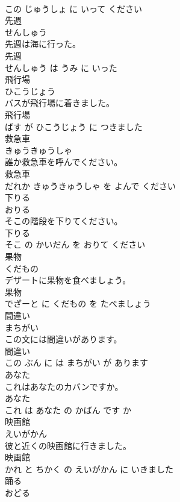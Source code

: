 \documentclass[8pt]{extreport}
\begin{document}
\begin{CJK}{UTF8}{min}
\\	この じゅうしょ に いって ください			
\\	先週	
\\	せんしゅう			
\\	先週は海に行った。	
\\	先週 
\\	せんしゅう は うみ に いった			
\\	飛行場	
\\	ひこうじょう			
\\	バスが飛行場に着きました。	
\\	飛行場 
\\	ばす が ひこうじょう に つきました			
\\	救急車	
\\	きゅうきゅうしゃ			
\\	誰か救急車を呼んでください。	
\\	救急車 
\\	だれか きゅうきゅうしゃ を よんで ください			
\\	下りる	
\\	おりる			
\\	そこの階段を下りてください。	
\\	下りる 
\\	そこ の かいだん を おりて ください			
\\	果物	
\\	くだもの			
\\	デザートに果物を食べましょう。	
\\	果物 
\\	でざーと に くだもの を たべましょう			
\\	間違い	
\\	まちがい			
\\	この文には間違いがあります。	
\\	間違い 
\\	この ぶん に は まちがい が あります			
\\	あなた	
\\	これはあなたのカバンですか。	
\\	あなた 
\\	これ は あなた の かばん です か			
\\	映画館	
\\	えいがかん			
\\	彼と近くの映画館に行きました。	
\\	映画館 
\\	かれ と ちかく の えいがかん に いきました			
\\	踊る	
\\	おどる			

\end{CJK}
\end{document}
